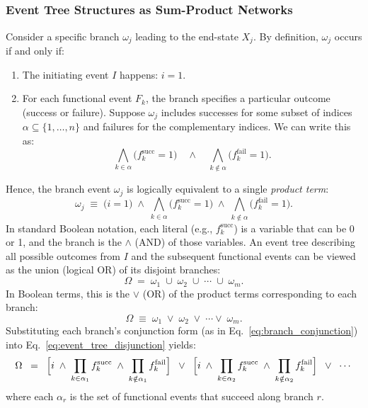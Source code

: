 \subsection{\color{blue}{DNF}}
\label{sec:event_trees_as_2_lvl_circuits}

\subsubsection{Event Tree Structures as Sum-Product Networks}
Consider a specific branch \(\omega_j\) leading to the end-state \(X_j\).  By definition, \(\omega_j\) occurs if and only if:
\begin{enumerate}
    \item The initiating event \(I\) happens: \(i=1\).
    \item For each functional event \(F_k\), the branch specifies a particular outcome (success or failure).  Suppose \(\omega_j\) includes successes for some subset of indices \(\alpha\subseteq \{1,\ldots,n\}\) and failures for the complementary indices.  We can write this as:
    \[
        \bigwedge_{k\in \alpha}  \bigl(f_{k}^{\text{succ}} = 1\bigr)
        \quad\wedge\quad
        \bigwedge_{k\notin \alpha} \bigl(f_{k}^{\text{fail}} = 1\bigr).
    \]
\end{enumerate}
Hence, the branch event \(\omega_j\) is logically equivalent to a single \emph{product term}:
\begin{equation}
\label{eq:branch_conjunction}
    \omega_j \;\equiv\; 
    \bigl(i=1\bigr)
    \;\wedge\;
    \bigwedge_{k\in \alpha} \bigl(f_k^{\text{succ}}=1\bigr)
    \;\wedge\;
    \bigwedge_{k\notin \alpha} \bigl(f_k^{\text{fail}}=1\bigr).
\end{equation}
In standard Boolean notation, each literal (e.g., \(f_k^{\text{succ}}\)) is a variable that can be 0 or 1, and the branch is the \(\land\) (AND) of those variables. An event tree describing all possible outcomes from \(I\) and the subsequent functional events can be viewed as the union (logical OR) of its disjoint branches:
\[
    \Omega \;=\; \omega_1 \;\cup\; \omega_2 \;\cup\;\cdots \;\cup\; \omega_m.
\]
In Boolean terms, this is the \(\lor\) (OR) of the product terms corresponding to each branch:
\begin{equation}
\label{eq:event_tree_disjunction}
    \Omega
    \;\equiv\;
    \omega_1
    \;\lor\;
    \omega_2
    \;\lor\;\cdots\lor\;
    \omega_m.
\end{equation}
Substituting each branch’s conjunction form (as in Eq.~\eqref{eq:branch_conjunction}) into Eq.~\eqref{eq:event_tree_disjunction} yields:
\[
    \Omega 
    \;\;=\;\;
    \Bigl[
        i \;\wedge\; \prod_{k\in \alpha_1} f_k^{\text{succ}} \;\wedge\; \prod_{k\notin \alpha_1} f_k^{\text{fail}}
    \Bigr]
    \;\;\lor\;\;
    \Bigl[
        i \;\wedge\; \prod_{k\in \alpha_2} f_k^{\text{succ}} \;\wedge\; \prod_{k\notin \alpha_2} f_k^{\text{fail}}
    \Bigr]
    \;\;\lor\;\;
    \cdots
\]
where each \(\alpha_r\) is the set of functional events that succeed along branch \(r\).

